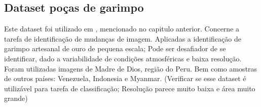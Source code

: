 

\subsection{Dataset poças de garimpo}\label{sec:Cap2_amazonia_garimpo}

Este dataset foi utilizado em \cite{rs14071746}, mencionado no capitulo anterior. Concerne a tarefa de identificação de mudanças de imagem. Aplicadas a identificação de garimpo artesanal de ouro de pequena escala; Pode ser desafiador de se identificar, dado a variabilidade de condições atmosféricas e baixa resolução. Foram utilizadas imagens de Madre de Dios, região do Peru. Bem como amostras de outros países: Venezuela, Indonesia e Myanmar. (Verificar se esse dataset é utilizável para tarefa de classificação; Resolução parece muito baixa e área muito grande)



